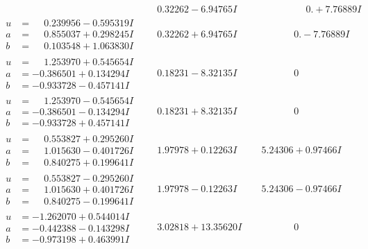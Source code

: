 \documentclass[1p]{elsarticle_modified}
\theoremstyle{definition}
\begin{document}
$$\begin{array}{c|c|c}
 & \phantom{-}0.32262 - 6.94765 I & \phantom{-0.000000 -}0. + 7.76889 I \\ \hline\begin{aligned}
u &= \phantom{-}0.239956 - 0.595319 I \\
a &= \phantom{-}0.855037 + 0.298245 I \\
b &= \phantom{-}0.103548 + 1.063830 I\end{aligned}
 & \phantom{-}0.32262 + 6.94765 I & \phantom{-0.000000 } 0. - 7.76889 I \\ \hline\begin{aligned}
u &= \phantom{-}1.253970 + 0.545654 I \\
a &= -0.386501 + 0.134294 I \\
b &= -0.933728 - 0.457141 I\end{aligned}
 & \phantom{-}0.18231 - 8.32135 I & \phantom{-0.000000 } 0 \\ \hline\begin{aligned}
u &= \phantom{-}1.253970 - 0.545654 I \\
a &= -0.386501 - 0.134294 I \\
b &= -0.933728 + 0.457141 I\end{aligned}
 & \phantom{-}0.18231 + 8.32135 I & \phantom{-0.000000 } 0 \\ \hline\begin{aligned}
u &= \phantom{-}0.553827 + 0.295260 I \\
a &= \phantom{-}1.015630 - 0.401726 I \\
b &= \phantom{-}0.840275 + 0.199641 I\end{aligned}
 & \phantom{-}1.97978 + 0.12263 I & \phantom{-}5.24306 + 0.97466 I \\ \hline\begin{aligned}
u &= \phantom{-}0.553827 - 0.295260 I \\
a &= \phantom{-}1.015630 + 0.401726 I \\
b &= \phantom{-}0.840275 - 0.199641 I\end{aligned}
 & \phantom{-}1.97978 - 0.12263 I & \phantom{-}5.24306 - 0.97466 I \\ \hline\begin{aligned}
u &= -1.262070 + 0.544014 I \\
a &= -0.442388 - 0.143298 I \\
b &= -0.973198 + 0.463991 I\end{aligned}
 & \phantom{-}3.02818 + 13.35620 I & \phantom{-0.000000 } 0 \\ \hline\begin{aligned}

\end{aligned}
\end{array}$$
\end{document}
